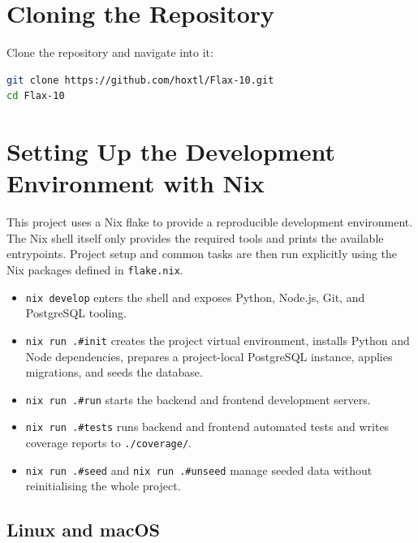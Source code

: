 \documentclass[a4paper, 12pt]{report}
\begin{document}
\chapter{Cloning the Repository}

Clone the repository and navigate into it:

\begin{lstlisting}[language=bash]
git clone https://github.com/hoxtl/Flax-10.git
cd Flax-10
\end{lstlisting}

\chapter{Setting Up the Development Environment with Nix}

This project uses a Nix flake to provide a reproducible development
environment. The Nix shell itself only provides the required tools and
prints the available entrypoints. Project setup and common tasks are
then run explicitly using the Nix packages defined in
\texttt{flake.nix}.

\begin{itemize}
    \item \texttt{nix develop} enters the shell and exposes Python,
          Node.js, Git, and PostgreSQL tooling.
    \item \texttt{nix run .\#init} creates the project virtual
          environment, installs Python and Node dependencies, prepares
          a project-local PostgreSQL instance, applies migrations, and
          seeds the database.
    \item \texttt{nix run .\#run} starts the backend and frontend
          development servers.
    \item \texttt{nix run .\#tests} runs backend and frontend automated
          tests and writes coverage reports to \texttt{./coverage/}.
    \item \texttt{nix run .\#seed} and \texttt{nix run .\#unseed}
          manage seeded data without reinitialising the whole project.
\end{itemize}

\section{Linux and macOS}
\end{document}
